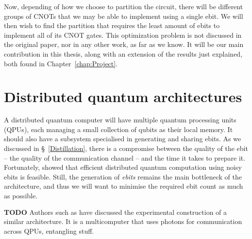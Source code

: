 Now, depending of how we choose to partition the circuit, there will be different groups of CNOTs that we may be able to implement using a single ebit. We will then wish to find the partition that requires the least amount of ebits to implement all of its CNOT gates. This optimization problem is not discussed in the original paper, nor in any other work, as far as we know. It will be our main contribution in this thesis, along with an extension of the results just explained, both found in Chapter~\ref{chap:Project}.


\section{Distributed quantum architectures}
\label{DQC_Architecture} 

A distributed quantum computer will have multiple quantum processing units (QPUs), each managing a small collection of qubits as their local memory. It should also have a subsystem specialised in generating and sharing ebits. As we discussed in \S~\ref{Distillation}, there is a compromise between the quality of the ebit -- the quality of the communication channel -- and the time it takes to prepare it. Fortunately, \citet{NoisyChannels} showed that efficient distributed quantum computation using noisy ebits is feasible. Still, the generation of \textit{ebits} remains the main bottleneck of the architecture, and thus we will want to minimise the required ebit count as much as possible. 

\textbf{TODO} Authors such as \citet{DistributedQCHW} have discussed the experimental construction of a similar architecture. It is a multicomputer that uses photons for communication across QPUs, entangling stuff. 